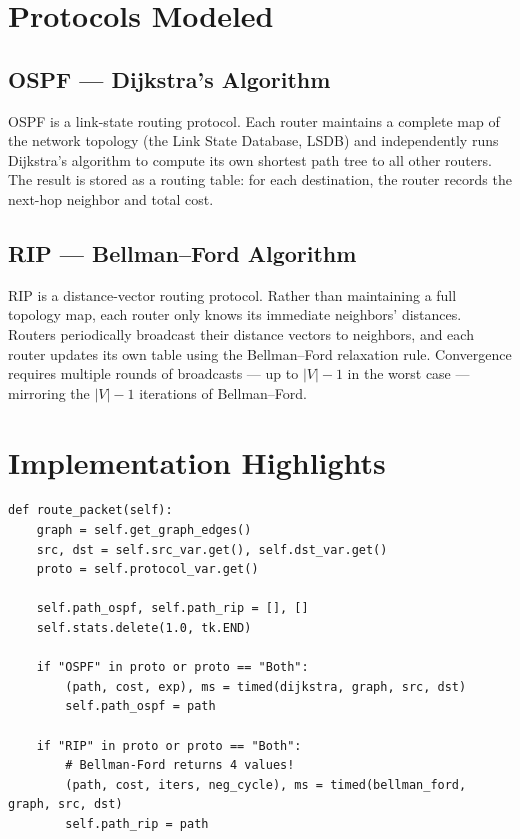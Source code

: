 \documentclass[12pt, a4paper, oneside]{report}
\theoremstyle{definition}
\begin{document}
\section{Protocols Modeled}

\subsection{OSPF — Dijkstra's Algorithm}

OSPF is a link-state routing protocol. Each router maintains a complete map of the network topology (the Link State Database, LSDB) and independently runs Dijkstra's algorithm to compute its own shortest path tree to all other routers. The result is stored as a routing table: for each destination, the router records the next-hop neighbor and total cost.

\subsection{RIP — Bellman–Ford Algorithm}

RIP is a distance-vector routing protocol. Rather than maintaining a full topology map, each router only knows its immediate neighbors' distances. Routers periodically broadcast their distance vectors to neighbors, and each router updates its own table using the Bellman–Ford relaxation rule. Convergence requires multiple rounds of broadcasts — up to $|V|-1$ in the worst case — mirroring the $|V|-1$ iterations of Bellman–Ford.

\section{Implementation Highlights}

\begin{lstlisting}[caption={OSPF and RIP routing (from case\_study\_3\_routing/network\_routing.py)}, label={lst:ospf_impl}]
def route_packet(self):
    graph = self.get_graph_edges()
    src, dst = self.src_var.get(), self.dst_var.get()
    proto = self.protocol_var.get()
    
    self.path_ospf, self.path_rip = [], []
    self.stats.delete(1.0, tk.END)
    
    if "OSPF" in proto or proto == "Both":
        (path, cost, exp), ms = timed(dijkstra, graph, src, dst)
        self.path_ospf = path
        
    if "RIP" in proto or proto == "Both":
        # Bellman-Ford returns 4 values!
        (path, cost, iters, neg_cycle), ms = timed(bellman_ford, graph, src, dst)
        self.path_rip = path
\end{lstlisting}
\end{document}
